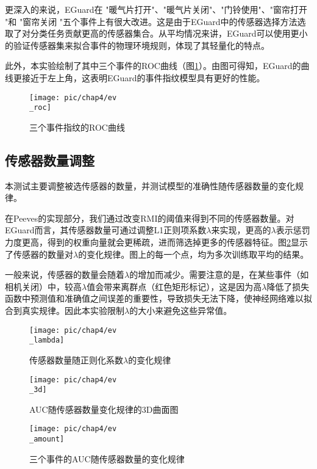 更深入的来说，EGuard在 "暖气片打开"、"暖气片关闭"、"门铃使用"、"窗帘打开 "和 "窗帘关闭 "五个事件上有很大改进。这是由于EGuard中的传感器选择方法选取了对分类任务贡献更高的传感器集合。从平均情况来讲，EGuard可以使用更小的验证传感器集来拟合事件的物理环境规则，体现了其轻量化的特点。

此外，本实验绘制了其中三个事件的ROC曲线（图\ref{fig:ev_roc}）。由图可得知，EGuard的曲线更接近于左上角，这表明EGuard的事件指纹模型具有更好的性能。

\begin{figure}[!h]
	\centering
	\texttt{[image: pic/chap4/ev\\\_roc]}
	\caption{三个事件指纹的ROC曲线}
	\label{fig:ev_roc}
\end{figure}

\subsection{传感器数量调整}

本测试主要调整被选传感器的数量，并测试模型的准确性随传感器数量的变化规律。

在Peeves的实现部分，我们通过改变RMI的阈值来得到不同的传感器数量。对EGuard而言，其传感器数量可通过调整L1正则项系数$\lambda$来实现，更高的$\lambda$表示惩罚力度更高，得到的权重向量就会更稀疏，进而筛选掉更多的传感器特征。图\ref{fig:ev_lambda}显示了传感器的数量对$\lambda$的变化规律。图上的每一个点，均为多次训练取平均的结果。

一般来说，传感器的数量会随着$\lambda$的增加而减少。需要注意的是，在某些事件（如相机关闭）中，较高$\lambda$值会带来离群点（红色矩形标记），这是因为高$\lambda$降低了损失函数中预测值和准确值之间误差的重要性，导致损失无法下降，使神经网络难以拟合到真实规律。因此本实验限制$\lambda$的大小来避免这些异常值。

\begin{figure}[!h]
	\centering
	\texttt{[image: pic/chap4/ev\\\_lambda]}
	\caption{传感器数量随正则化系数$\lambda$的变化规律}
	\label{fig:ev_lambda}
\end{figure}

\begin{figure}[!h]
	\centering
	\texttt{[image: pic/chap4/ev\\\_3d]}
	\caption{AUC随传感器数量变化规律的3D曲面图}
\label{fig:ev_3d}
\end{figure}

\begin{figure}[!h]
	\centering
	\texttt{[image: pic/chap4/ev\\\_amount]}
	\caption{三个事件的AUC随传感器数量的变化规律}
	\label{fig:ev_amount}
\end{figure}

